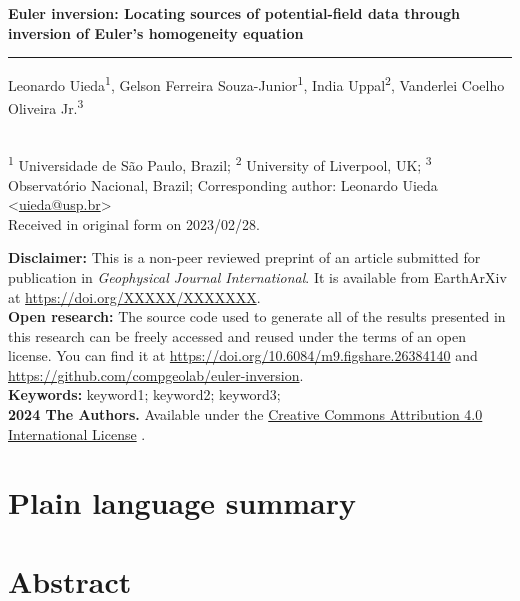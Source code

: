 \documentclass[onecolumn,10pt]{article}
\makeatletter
\newcommand{\Title}{Euler inversion: Locating sources of potential-field data through inversion of Euler's homogeneity equation}
\newcommand{\Year}{2024}
\newcommand{\SubmittedOn}{2023/02/28}
\newcommand{\PublishedOn}{2023/02/28}
\newcommand{\AuthorShort}{Uieda et al.}
\newcommand{\Authors}{%
  Leonardo Uieda\textsuperscript{1},
  Gelson Ferreira Souza-Junior\textsuperscript{1},
  India Uppal\textsuperscript{2},
  Vanderlei Coelho Oliveira Jr.\textsuperscript{3}
}
\newcommand{\Email}{uieda@usp.br}
\newcommand{\Corresponding}{%
  Corresponding author: Leonardo Uieda <\href{mailto:\Email}{\Email}>
}
\newcommand{\Affiliations}{%
  \textsuperscript{1} Universidade de São Paulo, Brazil;
  \textsuperscript{2} University of Liverpool, UK;
  \textsuperscript{3} Observatório Nacional, Brazil;
}
\newcommand{\Journal}{Geophysical Journal International}
\newcommand{\JournalDOI}{YYYYY/YYYYYYY}
\newcommand{\PreprintDOI}{XXXXX/XXXXXXX}
\newcommand{\ArchiveDOI}{10.6084/m9.figshare.26384140}
\newcommand{\GitHubRepository}{compgeolab/euler-inversion}
\newcommand{\Keywords}{%
  keyword1; keyword2; keyword3;
}
\makeatother
\begin{document}
\thispagestyle{plain}
\begin{FlushLeft}
  \begin{spacing}{2}
    {\LARGE\bfseries \Title}
  \end{spacing}
  {\color{lightgray}\hrule height 1.5pt}
  \vspace{0.3cm}
  \Authors
  \\[0.2cm]
  {\footnotesize \Affiliations}
  \newline
  {\footnotesize \Corresponding}
  \\[0.2cm]
  {\footnotesize
    Received in original form on \SubmittedOn.
  }
\end{FlushLeft}

\begin{summarybox}
  \noindent
  \textbf{Disclaimer:}
  This is a non-peer reviewed preprint of an article submitted for publication
  in \textit{\Journal{}}. It is available from EarthArXiv at
  \url{https://doi.org/\PreprintDOI}.
  \\[0.25cm]
  \noindent
  \textbf{Open research:}
  The source code used to generate all of the results presented in this
  research can be freely accessed and reused under the terms of an open license.
  You can find it at \url{https://doi.org/\ArchiveDOI} and
  \url{https://github.com/\GitHubRepository}.
  \\[0.25cm]
  \noindent
  \textbf{Keywords:} \Keywords{}
  \\[0.25cm]
  \noindent
  \textbf{\textcopyright{} \Year{} The Authors.}
  Available under the \href{https://creativecommons.org/licenses/by/4.0/}{Creative Commons Attribution 4.0 International License}
  \faCreativeCommons\faCreativeCommonsBy{}.
\end{summarybox}

\section*{\normalsize Plain language summary}
\begingroup
   \small  \par
\endgroup

\section*{\normalsize Abstract}
\begingroup
   \small  \par
\endgroup





\end{document}
